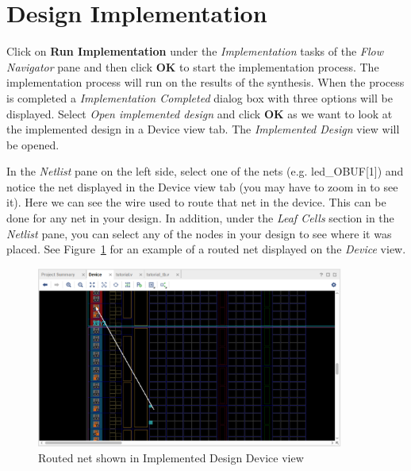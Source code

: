 \documentclass[11pt]{article}
\begin{document}
\section{Design Implementation}
\label{sec:impl}
Click on \textbf{Run Implementation} under the \textit{Implementation} tasks of the \textit{Flow Navigator} pane and then click \textbf{OK} to start the implementation process. The implementation process will run on the results of the synthesis. When the process is completed a \textit{Implementation Completed} dialog box with three options will be displayed. Select \textit{Open implemented design} and click \textbf{OK} as we want to look at the implemented design in a Device view tab. The \textit{Implemented Design} view will be opened.

In the \textit{Netlist} pane on the left side, select one of the nets (e.g. led\_OBUF[1]) and notice the net displayed in the Device view tab (you may have to zoom in to see it). Here we can see the wire used to route that net in the device. This can be done for any net in your design. In addition, under the \textit{Leaf Cells} section in the \textit{Netlist} pane, you can select any of the nodes in your design to see where it was placed. See Figure~\ref{fig:net_route} for an example of a routed net displayed on the \textit{Device} view.

\begin{figure}[!h]
    \centering
    \includegraphics[width=0.9\textwidth]{images/net_route.png}
    \caption{Routed net shown in Implemented Design Device view}
    \label{fig:net_route}
\end{figure}
\end{document}
